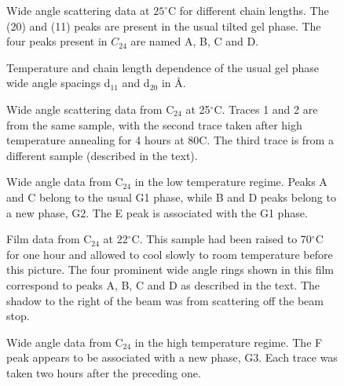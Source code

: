 \begin{figure}
\centerline {}
\caption{Wide angle scattering data at $25^{\circ}$C for different chain 
lengths. The (20) and (11) peaks are present in the usual tilted gel phase. The four
peaks present in $C_{24}$ are named A, B, C and D.
\label{fig1}}
\end{figure}

\begin{figure}
\centerline {}
\caption{Temperature and chain length dependence of the usual
gel phase wide angle spacings d$_{11}$ and d$_{20}$ in {\AA}.
\label{fig2}}
\end{figure}

\begin{figure}
\centerline {}
\caption{Wide angle scattering data from C$_{24}$ at 25$^{\circ}$C. 
Traces 1 and 2 are from the same sample, with the second trace taken after high
temperature annealing for 4 hours at 80C. The third trace is from a 
different sample (described in the text).
\label{fig3}}
\end{figure}

\begin{figure}
\centerline {}
\caption{Wide angle data from C$_{24}$ in the low temperature regime. Peaks
A and C belong to the usual G1 phase, while B and D peaks belong to a new
phase, G2. The E peak is associated with the G1 phase.
\label{fig4}}
\end{figure}

\begin{figure}
\caption{Film data from C$_{24}$ at 22$^{\circ}$C. This sample had been
raised to 70$^{\circ}$C for one hour and allowed to cool slowly to room 
temperature before this picture. The four prominent wide angle rings shown in 
this film correspond to peaks A, B, C and D as described in the text. The shadow
to the right of the beam was from scattering off the beam stop.
\label{fig5}}
\end{figure}

\begin{figure}
\centerline {}
\caption{Wide angle data from C$_{24}$ in the high temperature regime. 
The F peak appears to be associated with a new phase, G3.
Each trace was taken two hours after the preceding one.
\label{fig6}}
\end{figure}

